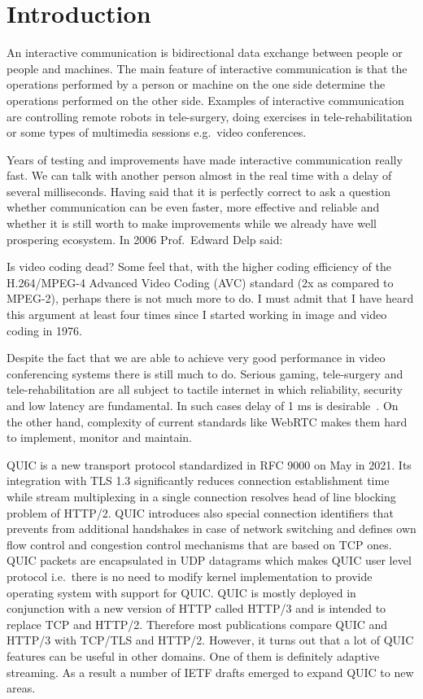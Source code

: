 \section{Introduction}
\label{sec:introduction}

An interactive communication is bidirectional data exchange between people or people and machines.
The main feature of interactive communication is that the operations performed by a person or machine on the one side determine the operations performed on the other side.
Examples of interactive communication are controlling remote robots in tele-surgery, doing exercises in tele-rehabilitation or some types of multimedia sessions e.g.\ video conferences.

Years of testing and improvements have made interactive communication really fast.
We can talk with another person almost in the real time with a delay of several milliseconds.
Having said that it is perfectly correct to ask a question whether communication can be even faster, more effective and reliable and whether it is still worth to make improvements while we already have well prospering ecosystem.
In 2006 Prof.\ Edward Delp said:
\begin{displayquote}
    Is video coding dead?
    Some feel that, with the higher coding efficiency of the H.264/MPEG-4 Advanced Video Coding (AVC) standard (2x as compared to MPEG-2), perhaps there is not much more to do.
    I must admit that I have heard this  argument at least four times since I started working in image and video coding in 1976.\cite{4015574}
\end{displayquote}
Despite the fact that we are able to achieve very good performance in video conferencing systems there is still much to do.
Serious gaming, tele-surgery and tele-rehabilitation are all subject to tactile internet in which reliability, security and low latency are fundamental.
In such cases delay of 1 ms is desirable~\cite{the-tactile-internet}.
On the other hand, complexity of current standards like WebRTC makes them hard to implement, monitor and maintain.


QUIC is a new transport protocol standardized in RFC 9000 on May in 2021.
Its integration with TLS 1.3 significantly reduces connection establishment time while stream multiplexing in a single connection resolves head of line blocking problem of HTTP/2.
QUIC introduces also special connection identifiers that prevents from additional handshakes in case of network switching and defines own flow control and congestion control mechanisms that are based on TCP ones.
QUIC packets are encapsulated in UDP datagrams which makes QUIC user level protocol i.e.\ there is no need to modify kernel implementation to provide operating system with support for QUIC\@.
QUIC is mostly deployed in conjunction with a new version of HTTP called HTTP/3 and is intended to replace TCP and HTTP/2.
Therefore most publications compare QUIC and HTTP/3 with TCP/TLS and HTTP/2.
However, it turns out that a lot of QUIC features can be useful in other domains.
One of them is definitely adaptive streaming.
As a result a number of IETF drafts emerged to expand QUIC to new areas.

